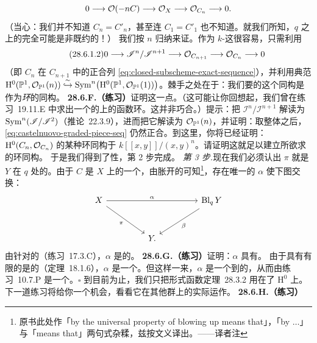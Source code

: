 \[
0\longrightarrow\mathcal{O}(-nC)\longrightarrow\mathcal{O}_X\longrightarrow\mathcal{O}_{C_n}\longrightarrow 0.
\]
（当心：我们并不知道 $C_n=C'_n$，甚至连 $C_1=C'_1$ 也不知道。就我们所知，$q$ 之上的\trFiber{}完全可能是非既约的！）
我们按 $n$ 归纳来证。作为 $k$-\trVectorSpace{}这很容易，只需利用
\begin{equation*}
\tag{28.6.1.2}\label{eq:castelnuovo-graded-piece-seq}
0\longrightarrow\mathscr{I}^n/\mathscr{I}^{n+1}\longrightarrow\mathcal{O}_{C_{n+1}}\longrightarrow\mathcal{O}_{C_n}\longrightarrow 0
\end{equation*}
（即 $C_n$ 在 $C_{n+1}$ 中的\trClosedSubscheme{}正合列 \eqref{eq:closed-subscheme-exact-sequence}），并利用典范\trIsomorphism{} $\mathrm{H}^0(\mathbb{P}^1,\mathcal{O}_{\mathbb{P}^1}(n))\stackrel{\sim}{\hookrightarrow}\operatorname{Sym}^n\bigl(\mathrm{H}^0(\mathbb{P}^1,\mathcal{O}_{\mathbb{P}^1}(1))\bigr)$。棘手之处在于：我们要的这个同构是作为\emph{环}的同构。
\textbf{28.6.F.（练习）}\quad 证明这一点。（这可能让你回想起，我们曾在\mbox{练习~19.11.E} 中求出一个\trInvertibleSheaf{}的\trTotalSpace{}上的函数环。这并非巧合。）提示：把 $\mathscr{I}^n/\mathscr{I}^{n+1}$ 解读为 $\operatorname{Sym}^n(\mathscr{I}/\mathscr{I}^2)$（\mbox{推论~22.3.9}），进而把它解读为 $\mathcal{O}_{\mathbb{P}^1}(n)$，并证明：取整体\trSection{}之后，\eqref{eq:castelnuovo-graded-piece-seq} 仍然正合。到这里，你将已经证明：$\mathrm{H}^0(C_n,\mathcal{O}_{C_n})$ 的某种\trAssociatedGraded{}环同构于 $k[[x,y]]/(x,y)^n$。请证明这就足以建立所欲求的环同构。
于是我们得到了\trSmooth{}性，第 2 步完成。
\emph{第 3 步.}\quad 现在我们必须认出 $\pi$ 就是 $Y$ 在 $q$ 处的\trBlowup。由于 $C$ 是 $X$ 上的一个\trEffectiveCartierDivisor，由胀开的\trUniversalProperty{}可知\footnote{原书此处作「by the universal property of blowing up means that」，「by $\ldots$」与「means that」两句式杂糅，兹按文义译出。——译者注}，存在唯一的\trMorphism{} $\alpha$ 使下图交换：
\[
\begin{tikzcd}[row sep=2.8em, column sep=4.5em]
X \ar[rr, "\alpha"] \ar[dr, "\pi"'] && \mathrm{Bl}_q\,Y \ar[dl, "\beta"] \\
& Y. &
\end{tikzcd}
\]
由针对\trProjective\trMorphism{}的\trCancellationTheorem{}（\mbox{练习~17.3.C}），$\alpha$ 是\trProjective{}的。
\textbf{28.6.G.（练习）}\quad 证明：$\alpha$ 具有\trFinite\trFiber。
由于具有有限\trFiber{}的\trProjective\trMorphism{}是\trFinite{}的（\mbox{定理~18.1.6}），$\alpha$ 是一个\trFinite\trMorphism。但这样一来，$\alpha$ 是一个到\trNormal\trScheme{}的\trBirational\trFinite\trMorphism，从而由\mbox{练习~10.7.P} 是一个\trIsomorphism。\hfill$\square$
到目前为止，我们只把\mbox{形式函数定理~28.3.2} 用在了 $\mathrm{H}^0$ 上。下一道练习将给你一个机会，看看它在其他\trCohomology{}群上的实际运作。
\textbf{28.6.H.（练习）}

